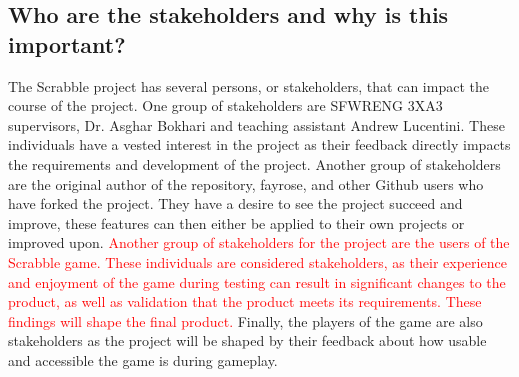 \documentclass{article}
\begin{document}
\subsection*{Who are the stakeholders and why is this important?}

The Scrabble project has several persons, or stakeholders, that can impact the course of the project. One group of stakeholders are SFWRENG 3XA3 supervisors, Dr. Asghar Bokhari and teaching assistant Andrew Lucentini. These individuals have a vested interest in the project as their feedback directly impacts the requirements and development of the project. Another group of stakeholders are the original author of the repository, fayrose, and other Github users who have forked the project. They have a desire to see the project succeed and improve, these features can then either be applied to their own projects or improved upon. \textcolor{red}{Another group of stakeholders for the project are the users of the Scrabble game. These individuals are considered stakeholders, as their experience and enjoyment of the game during testing can result in significant changes to the product, as well as validation that the product meets its requirements. These findings will shape the final product.} Finally, the players of the game are also stakeholders as the project will be shaped by their feedback about how usable and accessible the game is during gameplay.
\end{document}
